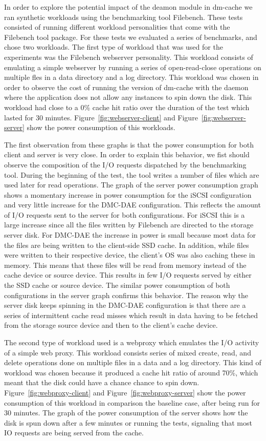 In order to explore the potential impact of the deamon module in dm-cache we ran
synthetic workloads using the benchmarking tool Filebench. These tests consisted
of running different workload personalities that come with the Filebench tool
package. For these tests we evaluated a series of benchmarks, and chose two
workloads.  The first type of workload that was used for the experiments was the
Filebench webserver personality. This workload consists of emulating a simple
webserver by running a series of open-read-close operations on multiple fles in
a data directory and a log directory. This workload was chosen in order to
observe the cost of running the version of dm-cache with the daemon where the
application does not allow any instances to spin down the disk.  This workload
had close to a 0\% cache hit ratio over the duration of the test which lasted
for 30 minutes. Figure~\ref{fig:webserver-client} and
Figure~\ref{fig:webserver-server} show the power consumption of this workloads.

The first observation from these graphs is that the power consumption for both
client and server is very close. In order to explain this behavior, we fist
should observe the composition of the I/O requests dispatched by the
benchmarking tool. During the beginning of the test, the tool writes a number of
files which are used later for read operations. The graph of the server power
consumption graph shows a momentary increase in power consumption for the iSCSI
configuration and very little increase for the DMC-DAE configuration. This
reflects the amount of I/O requests sent to the server for both
configurations. For iSCSI this is a large increase since all the files written
by Filebench are directed to the storage server disk. For DMC-DAE the increase
in power is small because most data for the files are being written to the
client-side SSD cache. In addition, while files were written to their respective
device, the client's OS was also caching these in memory. This means that these
files will be read from memory instead of the cache device or source
device. This results in few I/O requests served by either the SSD cache or
source device. The similar power consumption of both configurations in the
server graph confirms this behavior. The reason why the server disk keeps
spinning in the DMC-DAE configuration is that there are a series of intermittent
cache read misses which result in data having to be fetched from the storage
source device and then to the client's cache device.


The second type of workload used is a webproxy which emulates the I/O activity
of a simple web proxy.  This workload consists series of mixed create, read, and
delete operations done on multiple files in a data and a log directory. This
kind of workload was chosen because it produced a cache hit ratio of around
70\%, which meant that the disk could have a chance chance to spin
down. Figure~\ref{fig:webproxy-client} and Figure~\ref{fig:webproxy-server} show
the power consumption of this workload in comparison the baseline case, after
being run for 30 minutes. The graph of the power consumption of the server shows
how the disk is spun down after a few minutes or running the tests, signaling
that most IO requests are being served from the cache.

